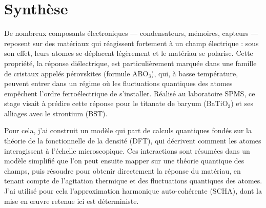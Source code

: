 \documentclass{rapportCS}
\begin{document}
\hypersetup{pageanchor=false}
\fairepagedegarde
\setcounter{figure}{0}
\hypersetup{pageanchor=true}
\renewcommand{\titre}{Transitions quantiques et susceptibilité}
\fairemarges
{}

\setcounter{page}{2}

\section*{Synthèse}
\begingroup\small

De nombreux composants électroniques --- condensateurs, mémoires, capteurs ---
reposent sur des matériaux qui réagissent fortement à un champ électrique :
sous son effet, leurs atomes se déplacent légèrement et le matériau se polarise.
Cette propriété, la réponse diélectrique, est particulièrement marquée dans une
famille de cristaux appelés pérovskites (formule ABO$_3$), qui, à basse
température, peuvent entrer dans un régime où les fluctuations quantiques des
atomes empêchent l'ordre ferroélectrique de s'installer. Réalisé au laboratoire
SPMS, ce stage visait à prédire cette réponse pour le titanate de baryum
(BaTiO$_3$) et ses alliages avec le strontium (BST).

Pour cela, j'ai construit un modèle qui part de calculs quantiques fondés sur la
théorie de la fonctionnelle de la densité (DFT), qui décrivent comment les
atomes interagissent à l'échelle microscopique. Ces interactions sont résumées
dans un modèle simplifié que l'on peut ensuite mapper sur une théorie quantique
des champs, puis résoudre pour obtenir directement la réponse du matériau, en
tenant compte de l'agitation thermique et des fluctuations quantiques des
atomes. J'ai utilisé pour cela l'approximation harmonique auto-cohérente (SCHA),
dont la mise en œuvre retenue ici est déterministe.
\end{document}
